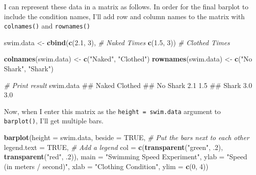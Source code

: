 \documentclass[]{book}
\newenvironment{Shaded}{\begin{snugshade}}{\end{snugshade}}
\newcommand{\KeywordTok}[1]{\textcolor[rgb]{0.13,0.29,0.53}{\textbf{{#1}}}}
\newcommand{\DataTypeTok}[1]{\textcolor[rgb]{0.13,0.29,0.53}{{#1}}}
\newcommand{\DecValTok}[1]{\textcolor[rgb]{0.00,0.00,0.81}{{#1}}}
\newcommand{\FloatTok}[1]{\textcolor[rgb]{0.00,0.00,0.81}{{#1}}}
\newcommand{\StringTok}[1]{\textcolor[rgb]{0.31,0.60,0.02}{{#1}}}
\newcommand{\CommentTok}[1]{\textcolor[rgb]{0.56,0.35,0.01}{\textit{{#1}}}}
\newcommand{\OtherTok}[1]{\textcolor[rgb]{0.56,0.35,0.01}{{#1}}}
\newcommand{\NormalTok}[1]{{#1}}
\theoremstyle{definition}
\theoremstyle{definition}
\theoremstyle{remark}
\begin{document}
I can represent these data in a matrix as follows. In order for the
final barplot to include the condition names, I'll add row and column
names to the matrix with \texttt{colnames()} and \texttt{rownames()}

\begin{Shaded}
\begin{Highlighting}[]
\NormalTok{swim.data <-}\StringTok{ }\KeywordTok{cbind}\NormalTok{(}\KeywordTok{c}\NormalTok{(}\FloatTok{2.1}\NormalTok{, }\DecValTok{3}\NormalTok{), }\CommentTok{# Naked Times}
                   \KeywordTok{c}\NormalTok{(}\FloatTok{1.5}\NormalTok{, }\DecValTok{3}\NormalTok{)) }\CommentTok{# Clothed Times}

\KeywordTok{colnames}\NormalTok{(swim.data) <-}\StringTok{ }\KeywordTok{c}\NormalTok{(}\StringTok{"Naked"}\NormalTok{, }\StringTok{"Clothed"}\NormalTok{)}
\KeywordTok{rownames}\NormalTok{(swim.data) <-}\StringTok{ }\KeywordTok{c}\NormalTok{(}\StringTok{"No Shark"}\NormalTok{, }\StringTok{"Shark"}\NormalTok{)}

\CommentTok{# Print result}
\NormalTok{swim.data}
\NormalTok{##          Naked Clothed}
\NormalTok{## No Shark   2.1     1.5}
\NormalTok{## Shark      3.0     3.0}
\end{Highlighting}
\end{Shaded}

Now, when I enter this matrix as the \texttt{height\ =\ swim.data}
argument to \texttt{barplot()}, I'll get multiple bars.

\begin{Shaded}
\begin{Highlighting}[]
\KeywordTok{barplot}\NormalTok{(}\DataTypeTok{height =} \NormalTok{swim.data,}
        \DataTypeTok{beside =} \OtherTok{TRUE}\NormalTok{,                        }\CommentTok{# Put the bars next to each other}
        \DataTypeTok{legend.text =} \OtherTok{TRUE}\NormalTok{,                   }\CommentTok{# Add a legend}
        \DataTypeTok{col =} \KeywordTok{c}\NormalTok{(}\KeywordTok{transparent}\NormalTok{(}\StringTok{"green"}\NormalTok{, .}\DecValTok{2}\NormalTok{), }
                \KeywordTok{transparent}\NormalTok{(}\StringTok{"red"}\NormalTok{, .}\DecValTok{2}\NormalTok{)),}
        \DataTypeTok{main =} \StringTok{"Swimming Speed Experiment"}\NormalTok{,}
        \DataTypeTok{ylab =} \StringTok{"Speed (in meters / second)"}\NormalTok{,}
        \DataTypeTok{xlab =} \StringTok{"Clothing Condition"}\NormalTok{,}
        \DataTypeTok{ylim =} \KeywordTok{c}\NormalTok{(}\DecValTok{0}\NormalTok{, }\DecValTok{4}\NormalTok{))}
\end{Highlighting}
\end{Shaded}
\end{document}
